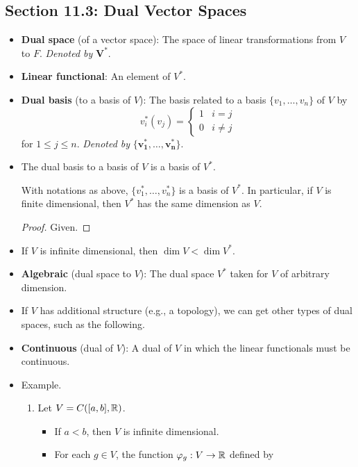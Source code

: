 \documentclass[../notes.tex]{subfiles}
\begin{document}
\subsection*{Section 11.3: Dual Vector Spaces}
\begin{itemize}
    \item \textbf{Dual space} (of a vector space): The space of linear transformations from $V$ to $F$. \emph{Denoted by} $\bm{V^*}$.
    \item \textbf{Linear functional}: An element of $V^*$.
    \item \textbf{Dual basis} (to a basis of $V$): The basis related to a basis $\{v_1,\dots,v_n\}$ of $V$ by
    \begin{equation*}
        v_i^*(v_j) =
        \begin{cases}
            1 & i=j\\
            0 & i\neq j
        \end{cases}
    \end{equation*}
    for $1\leq j\leq n$. \emph{Denoted by} $\bm{\{v_1^*,\ldots,v_n^*\}}$.
    \item The dual basis to a basis of $V$ is a basis of $V^*$.
    \begin{proposition}\label{prp:11.18}
        With notations as above, $\{v_1^*,\dots,v_n^*\}$ is a basis of $V^*$. In particular, if $V$ is finite dimensional, then $V^*$ has the same dimension as $V$.
        \begin{proof}
            Given.
        \end{proof}
    \end{proposition}
    \item If $V$ is infinite dimensional, then $\dim V<\dim V^*$.
    \item \textbf{Algebraic} (dual space to $V$): The dual space $V^*$ taken for $V$ of arbitrary dimension.
    \item If $V$ has additional structure (e.g., a topology), we can get other types of dual spaces, such as the following.
    \item \textbf{Continuous} (dual of $V$): A dual of $V$ in which the linear functionals must be continuous.
    \item Example.
    \begin{enumerate}
        \item Let $V=C([a,b],\mathbb{R})$.
        \begin{itemize}
            \item If $a<b$, then $V$ is infinite dimensional.
            \item For each $g\in V$, the function $\varphi_g:V\to\mathbb{R}$ defined by

\end{itemize}
\end{enumerate}
\end{itemize}
\end{document}
